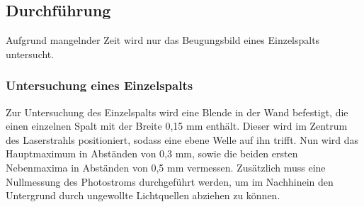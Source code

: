 \documentclass[titlepage = firstcover]{scrartcl}
\begin{document}
        \newpage
        \subsection{Durchführung}
            Aufgrund mangelnder Zeit wird nur das Beugungsbild eines Einzelspalts untersucht.
            \subsubsection*{Untersuchung eines Einzelspalts}
                Zur Untersuchung des Einzelspalts wird eine Blende in der Wand befestigt, die einen einzelnen Spalt mit der Breite 0,15 mm enthält. Dieser wird im Zentrum des
                Laserstrahls positioniert, sodass eine ebene Welle auf ihn trifft. Nun wird das Hauptmaximum in Abständen von 0,3 mm, sowie die beiden ersten Nebenmaxima in Abständen von 0,5 mm 
                vermessen. Zusätzlich muss eine Nullmessung des Photostroms durchgeführt werden, um im Nachhinein den Untergrund durch ungewollte Lichtquellen abziehen zu können. 


                    






                    
\end{document}

